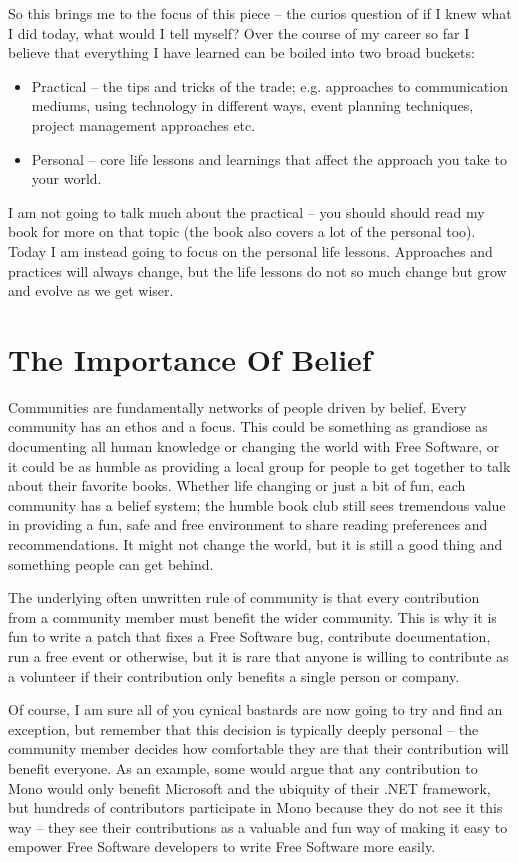 So this brings me to the focus of this piece -- the curios question of if I knew what I did today, what would I tell myself? Over the course of my career so far I believe that everything I have learned can be boiled into two broad buckets:
\begin{itemize}
 \item Practical -- the tips and tricks of the trade; e.g. approaches to communication mediums, using technology in different ways, event planning techniques, project management approaches etc.
 \item Personal -- core life lessons and learnings that affect the approach you take to your world.
\end{itemize}
I am not going to talk much about the practical -- you should should read my book for more on that topic (the book also covers a lot of the personal too).
Today I am instead going to focus on the personal life lessons. Approaches and practices will always change, but the life lessons do not so much change but grow and evolve as we get wiser.

\section*{The Importance Of Belief}

Communities are fundamentally networks of people driven by belief. Every community has an ethos and a focus. This could be something as grandiose as documenting all human knowledge or changing the world with Free Software, or it could be as humble as providing a local group for people to get together to talk about their favorite books. Whether life changing or just a bit of fun, each community has a belief system; the humble book club still sees tremendous value in providing a fun, safe and free environment to share reading preferences and recommendations. It might not change the world, but it is still a good thing and something people can get behind.

The underlying often unwritten rule of community is that every contribution from a community member must benefit the wider community. This is why it is fun to write a patch that fixes a Free Software bug, contribute documentation, run a free event or otherwise, but it is rare that anyone is willing to contribute as a volunteer if their contribution only benefits a single person or company.

Of course, I am sure all of you cynical bastards are now going to try and find an exception, but remember that this decision is typically deeply personal -- the community member decides how comfortable they are that their contribution will benefit everyone. As an example, some would argue that any contribution to Mono would only benefit Microsoft and the ubiquity of their .NET framework, but hundreds of contributors participate in Mono because they do not see it this way -- they see their contributions as a valuable and fun way of making it easy to empower Free Software developers to write Free Software more easily.

